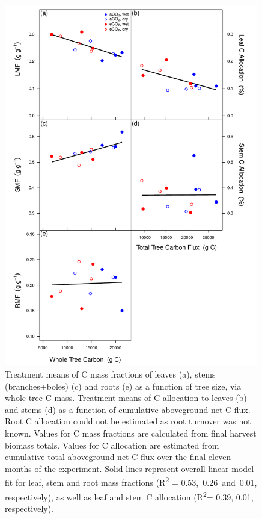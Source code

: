 \documentclass[a4paper]{article}\usepackage[]{graphicx}\usepackage[]{color}
\begin{document}
\begin{figure}[h!]
    \centering
    \includegraphics[width=0.99\textwidth]{allocfractions.pdf}
    \caption{Treatment means of C mass fractions of leaves (a), stems (branches+boles) (c) and roots (e) as a function of tree size, via whole tree C mass. Treatment means of C allocation to leaves (b) and stems (d) as a function of cumulative aboveground net C flux. Root C allocation could not be estimated as root turnover was not known. Values for C mass fractions are calculated from final harvest biomass totals. Values for C allocation are estimated from cumulative total aboveground net C flux over the final eleven months of the experiment. Solid lines represent overall linear model fit for leaf, stem and root mass fractions (R\textsuperscript{2} = 0.53,~0.26~and~0.01, respectively), as well as leaf and stem C allocation (R\textsuperscript{2}= 0.39, 0.01, respectively).}
    \label{fig:figure 4.5}
\end{figure}
\end{document}
